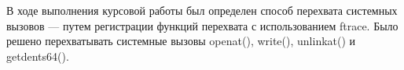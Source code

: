 \Conclusion 

В ходе выполнения курсовой работы был определен способ перехвата системных вызовов --- путем регистрации функций перехвата с использованием ftrace. Было решено перехватывать системные вызовы openat(), write(), unlinkat() и getdents64().